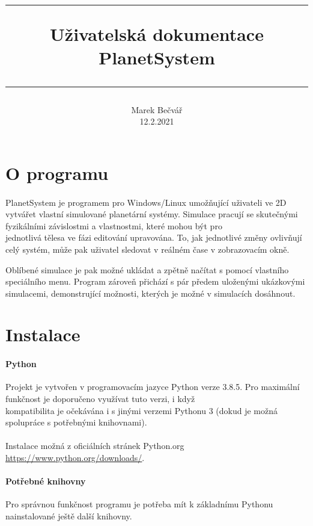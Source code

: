 \documentclass[a4paper, 12pt]{article}
\title{
        \vspace{1in}
        \rule{\linewidth}{0.5pt}
		\usefont{OT1}{bch}{b}{n}
        \huge Uživatelská dokumentace \\PlanetSystem\\
        \vspace{-10pt}
        \rule{\linewidth}{1pt}
}
\author{
		\normalfont\normalsize
        Marek Bečvář\\[-3pt]\normalsize
        12.2.2021
}
\date{}
\begin{document}
\maketitle 
\newpage

\tableofcontents
\newpage

\section{O programu} 
\paragraph{}
PlanetSystem je programem pro Windows/Linux umožňující uživateli ve 2D vytvářet vlastní
simulované planetární systémy. Simulace pracují se skutečnými fyzikálními
závislostmi a vlastnostmi, které mohou být pro \\jednotlivá tělesa ve fázi
editování upravována. To, jak jednotlivé změny ovlivňují celý systém, může pak
uživatel sledovat v reálném čase v zobrazovacím okně.

Oblíbené simulace je pak možné ukládat a zpětně načítat s pomocí vlastního
speciálního menu. Program zároveň přichází s pár předem uloženými ukázkovými
simulacemi, demonstrující možnosti, kterých je možné v simulacích dosáhnout. 

\section{Instalace}
\paragraph{Python}
Projekt je vytvořen v programovacím jazyce Python verze 3.8.5. Pro maximální
funkčnost je doporučeno využívat tuto verzi, i když \\kompatibilita je
očekávána i s jinými verzemi Pythonu 3 (dokud je možná spolupráce s potřebnými
knihovnami).\\\\ Instalace možná z oficiálních stránek Python.org
\url{https://www.python.org/downloads/}.

\paragraph{Potřebné knihovny} Pro správnou funkčnost programu je potřeba mít k
základnímu Pythonu nainstalované ještě další knihovny. 
\end{document}
